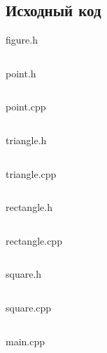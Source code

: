 \documentclass[12pt]{article}
\begin{document}
\subsection*{Исходный код}

{\Huge figure.h}
\inputminted{C++}{figure.h}
    \pagebreak
    
{\Huge point.h}
\inputminted{C++}{point.h}
    \pagebreak

{\Huge point.cpp}
\inputminted{C++}{point.cpp}
    \pagebreak

{\Huge triangle.h}
\inputminted{C++}{triangle.h}
\pagebreak

{\Huge triangle.cpp}
\inputminted{C++}{triangle.cpp}
\pagebreak

{\Huge rectangle.h}
\inputminted{C++}{rectangle.h}
\pagebreak

{\Huge rectangle.cpp}
\inputminted{C++}{rectangle.cpp}
\pagebreak

{\Huge square.h}
\inputminted{C++}{square.h}
\pagebreak

{\Huge square.cpp}
\inputminted{C++}{square.cpp}
\pagebreak
    
{\Huge main.cpp}
\inputminted{C++}{main.cpp}
    \pagebreak
\end{document}
